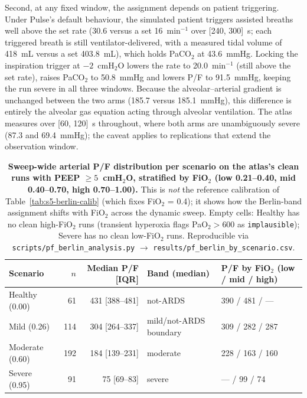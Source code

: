 \documentclass[pdflatex,sn-nature]{sn-jnl}%
\begin{document}
Second, at any fixed window, the assignment depends on patient triggering. Under Pulse's default behaviour, the simulated patient triggers assisted breaths well above the set rate (30.6 versus a set 16~min$^{-1}$ over [240, 300]~s; each triggered breath is still ventilator-delivered, with a measured tidal volume of 418~mL versus a set 403.8~mL), which holds PaCO$_2$ at 43.6~mmHg. Locking the inspiration trigger at $-2$~cmH$_2$O lowers the rate to 20.0~min$^{-1}$ (still above the set rate), raises PaCO$_2$ to 50.8~mmHg and lowers P/F to 91.5~mmHg, keeping the run severe in all three windows. Because the alveolar--arterial gradient is unchanged between the two arms (185.7 versus 185.1~mmHg), this difference is entirely the alveolar gas equation acting through alveolar ventilation. The atlas measures over [60, 120]~s throughout, where both arms are unambiguously severe (87.3 and 69.4~mmHg); the caveat applies to replications that extend the observation window.

\begin{table}[htbp]
\centering
\caption{\textbf{Sweep-wide arterial P/F distribution per scenario on the atlas's clean runs with PEEP $\geq 5$~cmH$_2$O, stratified by FiO$_2$ (low 0.21--0.40, mid 0.40--0.70, high 0.70--1.00).} This is \emph{not} the reference calibration of Table~\ref{tab:s5-berlin-calib} (which fixes FiO$_2$ = 0.4); it shows how the Berlin-band assignment shifts with FiO$_2$ across the dynamic sweep. Empty cells: Healthy has no clean high-FiO$_2$ runs (transient hyperoxia flags PaO$_2 > 600$ as \texttt{implausible}); Severe has no clean low-FiO$_2$ runs. Reproducible via \texttt{scripts/pf\_berlin\_analysis.py} $\rightarrow$ \texttt{results/pf\_berlin\_by\_scenario.csv}.}
\label{tab:s5-berlin-sweep}
\begin{tabular}{lrrlp{2.6cm}}
\toprule
Scenario & $n$ & Median P/F [IQR] & Band (median) & P/F by FiO$_2$ (low / mid / high) \\
\midrule
Healthy (0.00) & 61  & 431 [388--481] & not-ARDS & 390 / 481 / --- \\
Mild (0.26) & 114 & 304 [264--337] & mild/not-ARDS boundary & 309 / 282 / 287 \\
Moderate (0.60) & 192 & 184 [139--231] & moderate & 228 / 163 / 160 \\
Severe (0.95) & 91  & 75 [69--83]    & severe   & --- / 99 / 74 \\
\bottomrule
\end{tabular}
\end{table}
\end{document}
